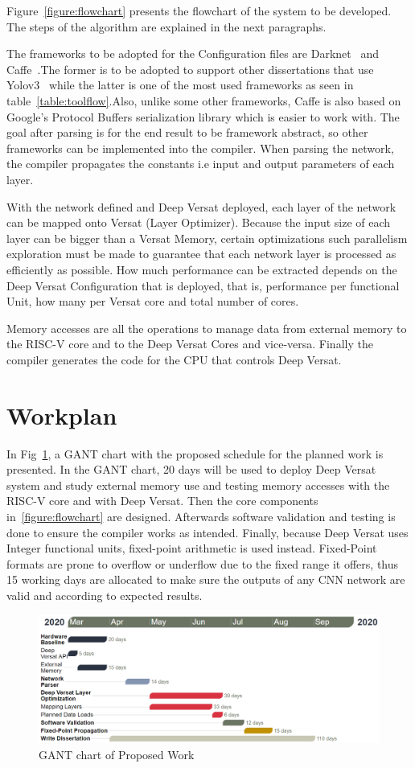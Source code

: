Figure~\ref{figure:flowchart} presents the flowchart of the system to be developed. The steps
of the algorithm are explained in the next paragraphs.


The frameworks to be adopted for the Configuration files are Darknet~\cite{darknet} and Caffe~\cite{caffe}.The former is to be adopted
to support other dissertations that use Yolov3~\cite{yolov3} while the latter is one of the most used frameworks as seen in table~\ref{table:toolflow}.Also,
unlike some other frameworks, Caffe is also based on Google's Protocol Buffers serialization library which is easier to work with.
The goal after parsing is for the end result to be framework abstract, so other frameworks can be implemented into the compiler.
When parsing the network, the compiler propagates the constants i.e input and output parameters of each layer.

With the network defined and Deep Versat deployed, each layer of the network can be mapped onto Versat (Layer Optimizer). Because the input size of each layer
can be bigger than a Versat Memory, certain optimizations such parallelism exploration must be made to guarantee that each network layer is processed as efficiently as possible. 
How much performance can be extracted depends on the Deep Versat Configuration that is deployed, that is, performance per functional Unit, how many per Versat core and
total number of cores.

Memory accesses are all the operations to manage data from external memory to the RISC-V core and to the Deep Versat Cores and vice-versa.
Finally the compiler generates the code for the CPU that controls Deep Versat.

\section{Workplan}

In Fig~\ref{figure:gant}, a GANT chart with the proposed schedule for the
planned work is presented. In the GANT chart, 20 days will be used to deploy Deep Versat system and study external memory use and testing
memory accesses with the RISC-V core and with Deep Versat. Then the core components in~\ref{figure:flowchart} are designed. Afterwards
software validation and testing is done to ensure the compiler works as intended. Finally, because Deep Versat uses Integer functional units, fixed-point arithmetic
is used instead. Fixed-Point formats are prone to overflow or underflow due to the fixed range it offers, thus 15 working days are allocated to
make sure the outputs of any CNN network are valid and according to expected results. 

\begin{figure}[!htpb]
    \includegraphics[width=1\textwidth]{Figures/gant22.png}
    \caption{GANT chart of Proposed Work}
    \label{figure:gant}
\end{figure}





